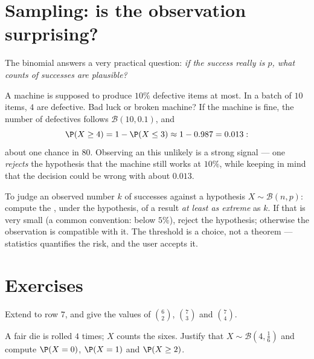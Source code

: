 \section{Sampling: is the observation surprising?}

The binomial  answers a very practical question: \emph{if the
success  really is $p$, what counts of successes are
plausible?}

\begin{example}\label{ex:g11:binom:decision}
A machine is supposed to produce $10\%$ defective items at most. In a
batch of $10$ items, $4$ are defective. Bad luck or broken machine? If
the machine is fine, the number of defectives follows
$\mathcal B(10, 0.1)$, and
\[
\P(X \geq 4) = 1 - \P(X \leq 3) \approx 1 - 0.987 = 0.013 :
\]
about one chance in $80$. Observing an  this unlikely is a strong
signal --- one \emph{rejects} the hypothesis that the machine still works
at $10\%$, while keeping in mind that the decision could be wrong with
 about $0.013$.
\end{example}

\begin{method}\label{met:g11:binom:decision}
To judge an observed number $k$ of successes against a hypothesis
$X \sim \mathcal B(n, p)$: compute the , under the hypothesis,
of a result \emph{at least as extreme} as $k$. If that  is
very small (a common convention: below $5\%$), reject the hypothesis;
otherwise the observation is compatible with it. The threshold is a
choice, not a theorem --- statistics quantifies the risk, and the user
accepts it.
\end{method}

\section{Exercises}

\begin{exercise}[$\star$]\label{exo:g11:binom:1}
Extend  to row $7$, and give the values of
$\binom62$, $\binom{7}{3}$ and $\binom74$.
\end{exercise}

\begin{exercise}[$\star$]\label{exo:g11:binom:2}
A fair die is rolled $4$ times; $X$ counts the sixes. Justify that
$X \sim \mathcal B\left(4, \frac16\right)$ and compute $\P(X = 0)$,
$\P(X = 1)$ and $\P(X \geq 2)$.
\end{exercise}

